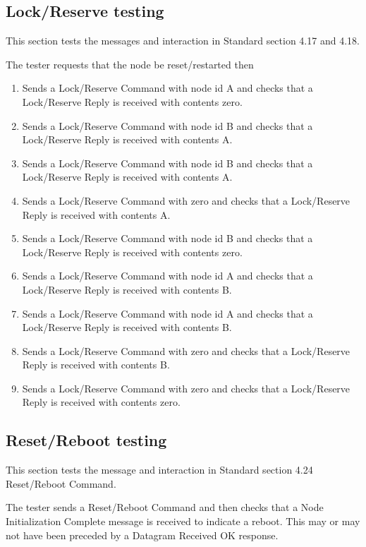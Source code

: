 \documentclass[11pt]{article}
\begin{document}
\subsection{Lock/Reserve testing}

This section tests the messages and interaction in Standard section 4.17 and 4.18.

The tester requests that the node be reset/restarted then 

\begin{enumerate}
\item Sends a Lock/Reserve Command with node id A
    and checks that a Lock/Reserve Reply is received with contents zero.
\item Sends a Lock/Reserve Command with node id B
    and checks that a Lock/Reserve Reply is received with contents A.
\item Sends a Lock/Reserve Command with node id B
    and checks that a Lock/Reserve Reply is received with contents A.
\item Sends a Lock/Reserve Command with zero 
    and checks that a Lock/Reserve Reply is received with contents A.
\item Sends a Lock/Reserve Command with node id B
    and checks that a Lock/Reserve Reply is received with contents zero.
\item Sends a Lock/Reserve Command with node id A
    and checks that a Lock/Reserve Reply is received with contents B.
\item Sends a Lock/Reserve Command with node id A
    and checks that a Lock/Reserve Reply is received with contents B.
\item Sends a Lock/Reserve Command with zero 
    and checks that a Lock/Reserve Reply is received with contents B.
\item Sends a Lock/Reserve Command with zero 
    and checks that a Lock/Reserve Reply is received with contents zero.

\end{enumerate}

\subsection{Reset/Reboot testing}

This section tests the message and interaction in Standard section 4.24 Reset/Reboot Command.

The tester sends a Reset/Reboot Command and then checks that a Node Initialization 
Complete message is received to indicate a reboot.  This may or may not have been
preceded by a Datagram Received OK response.
\end{document}
